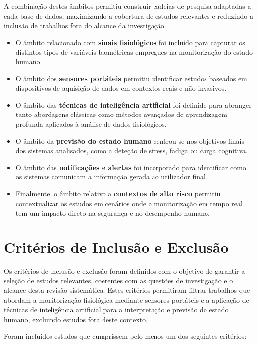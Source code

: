 A combinação destes âmbitos permitiu construir cadeias de pesquisa adaptadas a cada base de dados, maximizando a cobertura de estudos relevantes e reduzindo a inclusão de trabalhos fora do alcance da investigação.

\begin{itemize}
\item O âmbito relacionado com \textbf{sinais fisiológicos} foi incluído para capturar os distintos tipos de variáveis biométricas empregues na monitorização do estado humano.
\item O âmbito dos \textbf{sensores portáteis} permitiu identificar estudos baseados em dispositivos de aquisição de dados em contextos reais e não invasivos.
\item O âmbito das \textbf{técnicas de inteligência artificial} foi definido para abranger tanto abordagens clássicas como métodos avançados de aprendizagem profunda aplicados à análise de dados fisiológicos.
\item O âmbito da \textbf{previsão do estado humano} centrou-se nos objetivos finais dos sistemas analisados, como a deteção de stress, fadiga ou carga cognitiva.
\item O âmbito das \textbf{notificações e alertas} foi incorporado para identificar como os sistemas comunicam a informação gerada ao utilizador final.
\item Finalmente, o âmbito relativo a \textbf{contextos de alto risco} permitiu contextualizar os estudos em cenários onde a monitorização em tempo real tem um impacto direto na segurança e no desempenho humano.
\end{itemize}

\section{Critérios de Inclusão e Exclusão}
\label{sec:criterios}

Os critérios de inclusão e exclusão foram definidos com o objetivo de garantir a seleção de estudos relevantes, coerentes com as questões de investigação e o alcance desta revisão sistemática. Estes critérios permitiram filtrar trabalhos que abordam a monitorização fisiológica mediante sensores portáteis e a aplicação de técnicas de inteligência artificial para a interpretação e previsão do estado humano, excluindo estudos fora deste contexto.

\newpage
Foram incluídos estudos que cumprissem pelo menos um dos seguintes critérios:

